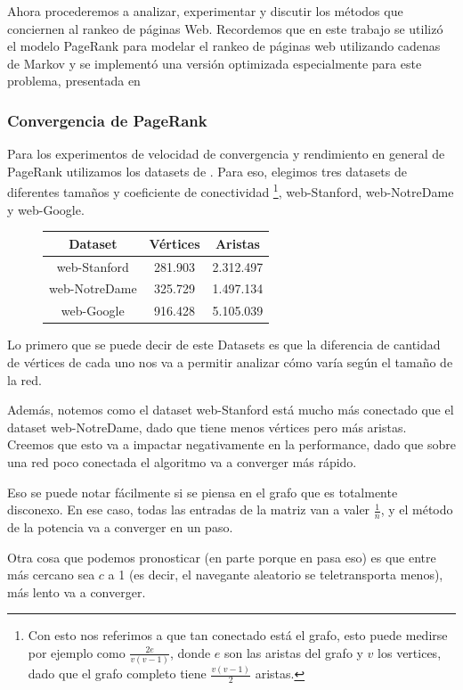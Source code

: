 Ahora procederemos a analizar, experimentar y discutir los métodos que conciernen al rankeo de páginas Web. Recordemos que en este trabajo se utilizó el modelo PageRank para modelar el rankeo de páginas web utilizando cadenas de Markov y se implementó una versión optimizada especialmente para este problema, presentada en \cite{Kamvar2003}

\subsubsection{Convergencia de PageRank}
Para los experimentos de velocidad de convergencia y rendimiento en general de PageRank utilizamos los datasets de \cite{SNAP}. Para eso, elegimos tres datasets de diferentes tamaños y coeficiente de conectividad \footnote{Con esto nos referimos a que tan conectado está el grafo, esto puede medirse por ejemplo como $\frac{2e}{v(v-1)}$, donde $e$ son las aristas del grafo y $v$ los vertices, dado que el grafo completo tiene $\frac{v(v-1)}{2}$ aristas.}, web-Stanford, web-NotreDame y web-Google.

\begin{figure}[H]
\centering
\begin{tabular}{| c | c | c |}
  \hline
  Dataset & Vértices & Aristas \\ \hline \hline
  web-Stanford & 281.903 & 2.312.497 \\ \hline
  web-NotreDame & 325.729 & 1.497.134 \\ \hline
  web-Google & 916.428 & 5.105.039 \\ \hline
\end{tabular}
\end{figure}


Lo primero que se puede decir de este Datasets es que la diferencia de cantidad de vértices de cada uno nos va a permitir analizar cómo varía según el tamaño de la red. 

Además, notemos como el dataset web-Stanford está mucho más conectado que el dataset web-NotreDame, dado que tiene menos vértices pero más aristas. Creemos que esto va a impactar negativamente en la performance, dado que sobre una red poco conectada el algoritmo va a converger más rápido.

Eso se puede notar fácilmente si se piensa en el grafo que es totalmente disconexo. En ese caso, todas las entradas de la matriz van a valer $\frac1n$, y el método de la potencia va a converger en un paso.

Otra cosa que podemos pronosticar (en parte porque en \cite{Kamvar2003} pasa eso) es que entre más cercano sea $c$ a 1 (es decir, el navegante aleatorio se teletransporta menos), más lento va a converger.

